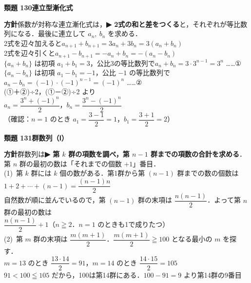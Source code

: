 \documentclass[a4paper,11pt]{ltjsarticle}
\newcommand{\ans}[2]{\Needspace{5\baselineskip}\vspace{6pt}%
  {\sffamily\bfseries 類題 #1\quad #2}\par}
\newcommand{\point}[1]{\textsf{\bfseries ▶ #1}}
\begin{document}
\ans{130}{連立型漸化式}
\begin{kai}
\textbf{方針}\quad 係数が対称な連立漸化式は，\point{2式の和と差をつくる}と，それぞれが等比数列になる．最後に連立して $a_n,\ b_n$ を求める．\\[2pt]
2式を辺々加えると\quad $a_{n+1}+b_{n+1}=3a_n+3b_n=3(a_n+b_n)$\\
2式を辺々引くと\quad $a_{n+1}-b_{n+1}=-a_n+b_n=-(a_n-b_n)$\\[2pt]
$\{a_n+b_n\}$ は初項 $a_1+b_1=3$，公比3の等比数列で\quad $a_n+b_n=3\cdot3^{n-1}=3^n$ ……①\\
$\{a_n-b_n\}$ は初項 $a_1-b_1=-1$，公比 $-1$ の等比数列で\quad $a_n-b_n=(-1)\cdot(-1)^{n-1}=(-1)^n$ ……②\\[2pt]
(①＋②)÷2，(①－②)÷2 より\\
\hspace*{1.5em}$a_n=\dfrac{3^n+(-1)^n}2$，\quad $b_n=\dfrac{3^n-(-1)^n}2$\\
（確認：$n=1$ のとき $a_1=\dfrac{3-1}2=1$，$b_1=\dfrac{3+1}2=2$）
\end{kai}

\ans{131}{群数列（Ⅰ）}
\begin{kai}
\textbf{方針}\quad 群数列は\point{第 $k$ 群の項数を調べ，第 $n-1$ 群までの項数の合計を求める}．第 $n$ 群の最初の数は「それまでの個数 $+1$」番目．\\[2pt]
(1)\ 第 $k$ 群には $k$ 個の数がある．第1群から第 $(n-1)$ 群までの数の個数は\\
\hspace*{1.5em}$1+2+\cdots+(n-1)=\dfrac{(n-1)n}2$\\
\hspace*{1.5em}自然数が順に並んでいるので，第 $(n-1)$ 群の末項は $\dfrac{n(n-1)}2$．よって第 $n$ 群の最初の数は\\
\hspace*{1.5em}$\dfrac{n(n-1)}2+1$\quad （$n\geqq2$．$n=1$ のときも1で成りたつ）\\[2pt]
(2)\ 第 $m$ 群の末項は $\dfrac{m(m+1)}2$．$\dfrac{m(m+1)}2\geqq100$ となる最小の $m$ を探す．\\
\hspace*{1.5em}$m=13$ のとき $\dfrac{13\cdot14}2=91$，\quad $m=14$ のとき $\dfrac{14\cdot15}2=105$\\
\hspace*{1.5em}$91<100\leqq105$ だから，100は第14群にある．$100-91=9$ より\quad 第14群の9番目
\end{kai}
\end{document}
